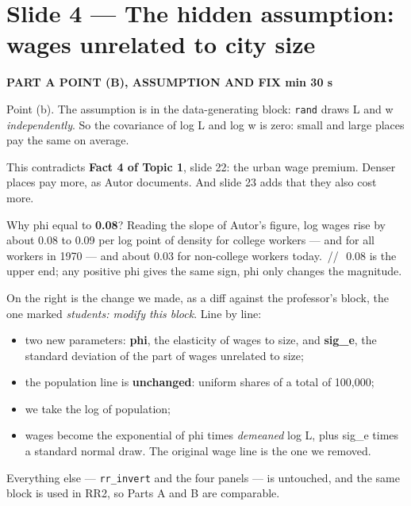 \documentclass[11pt,a4paper]{article}
\newcommand{\slide}[3]{\Needspace{14\baselineskip}\section{#1}\textcolor{unicared}{\small\bfseries\MakeUppercase{#3}\quad\textperiodcentered\quad #2}\par}
\newcommand{\pause}{\textcolor{unicared}{\,/\!/\,}}
\begin{document}
\slide{Slide 4 --- The hidden assumption: wages unrelated to city size}{1 min 30 s}{Part A \textperiodcentered{} point (b), assumption and fix}

\begin{say}
Point (b). The assumption is in the data-generating block: \texttt{rand} draws L and w \emph{independently}. So the covariance of log L and log w is zero: small and large places pay the same on average.

This contradicts \textbf{Fact 4 of Topic 1}, slide 22: the urban wage premium. Denser places pay more, as Autor documents. And slide 23 adds that they also cost more.

Why phi equal to \textbf{0.08}? Reading the slope of Autor's figure, log wages rise by about 0.08 to 0.09 per log point of density for college workers --- and for all workers in 1970 --- and about 0.03 for non-college workers today. \pause\ 0.08 is the upper end; any positive phi gives the same sign, phi only changes the magnitude.

On the right is the change we made, as a diff against the professor's block, the one marked \emph{students: modify this block}. Line by line:
\begin{itemize}[leftmargin=14pt,itemsep=2pt,topsep=2pt]
\item two new parameters: \textbf{phi}, the elasticity of wages to size, and \textbf{sig\_e}, the standard deviation of the part of wages unrelated to size;
\item the population line is \textbf{unchanged}: uniform shares of a total of 100,000;
\item we take the log of population;
\item wages become the exponential of phi times \emph{demeaned} log L, plus sig\_e times a standard normal draw. The original wage line is the one we removed.
\end{itemize}
Everything else --- \texttt{rr\_invert} and the four panels --- is untouched, and the same block is used in RR2, so Parts A and B are comparable.
\end{say}
\end{document}
